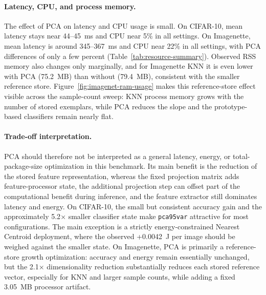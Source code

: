 \documentclass[sigconf,review,nonacm]{acmart}
\begin{document}
\paragraph{Latency, CPU, and process memory.}
The effect of PCA on latency and CPU usage is small.
On CIFAR-10, mean latency stays near 44--45~ms and CPU near 5\% in all settings. On Imagenette, mean latency is around 345--367~ms and CPU near 22\% in all settings, with PCA differences of only a few percent (Table~\ref{tab:resource-summary}).
Observed RSS memory also changes only marginally, and for Imagenette KNN it is even lower with PCA (75.2~MB) than without (79.4~MB), consistent with the smaller reference store.
Figure~\ref{fig:imagenet-ram-usage} makes this reference-store effect visible across the sample-count sweep: KNN process memory grows with the number of stored exemplars, while PCA reduces the slope and the prototype-based classifiers remain nearly flat.

\paragraph{Trade-off interpretation.}
PCA should therefore not be interpreted as a general latency, energy, or total-package-size optimization in this benchmark.
Its main benefit is the reduction of the stored feature representation, whereas the fixed projection matrix adds feature-processor state, the additional projection step can offset part of the computational benefit during inference, and the feature extractor still dominates latency and energy.
On CIFAR-10, the small but consistent accuracy gain and the approximately 5.2$\times$ smaller classifier state make \texttt{pca95var} attractive for most configurations. The main exception is a strictly energy-constrained Nearest Centroid deployment, where the observed +0.0042~J per image should be weighed against the smaller state.
On Imagenette, PCA is primarily a reference-store growth optimization: accuracy and energy remain essentially unchanged, but the 2.1$\times$ dimensionality reduction substantially reduces each stored reference vector, especially for KNN and larger sample counts, while adding a fixed 3.05~MB processor artifact.
\end{document}
